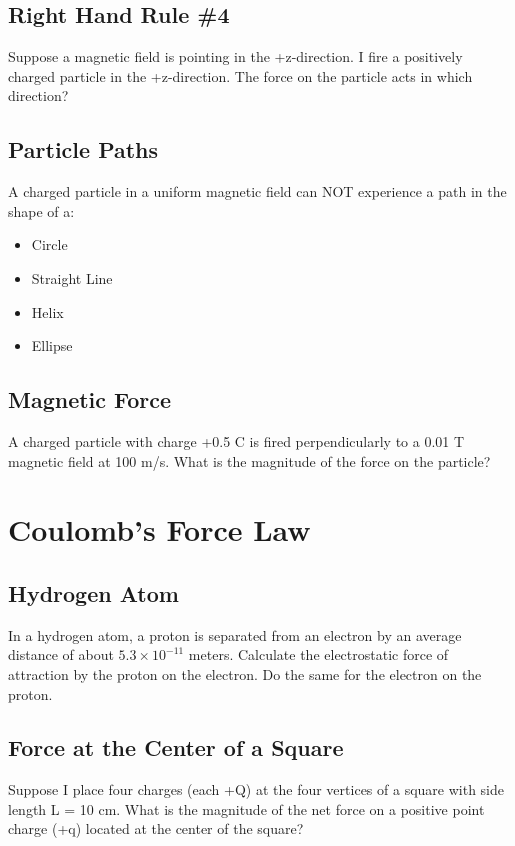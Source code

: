 \documentclass[12pt]{article}
\begin{document}
\subsection{Right Hand Rule \#4}
Suppose a magnetic field is pointing in the +z-direction.  I fire a positively charged particle in the +z-direction.  The force on the particle acts in which direction?

\subsection*{Particle Paths}
A charged particle in a uniform magnetic field can NOT experience a path in the shape of a:

\begin{itemize}
	\item Circle
	\item Straight Line
	\item Helix
	\item Ellipse
\end{itemize}


\subsection{Magnetic Force}
A charged particle with charge +0.5 C is fired perpendicularly to a 0.01 T magnetic field at 100 m/s.  What is the magnitude of the force on the particle?


\section{Coulomb's Force Law}

\subsection{Hydrogen Atom}
In a hydrogen atom, a proton is separated from an electron by an average distance of about $5.3 \times 10^{-11}$ meters.  Calculate the electrostatic force of attraction by the proton on the electron.  Do the same for the electron on the proton.

\subsection{Force at the Center of a Square}
Suppose I place four charges (each +Q) at the four vertices of a square with side length L = 10 cm.  What is the magnitude of the net force on a positive point charge (+q) located at the center of the square?
\end{document}
